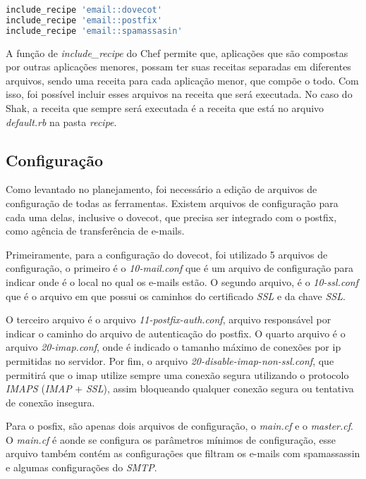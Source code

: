 \begin{lstlisting}[language=Ruby,label=dice_index,caption={Exemplo da receita de email
composta pelas receitas das outras aplicações}, label=codigo999]
include_recipe 'email::dovecot'
include_recipe 'email::postfix'
include_recipe 'email::spamassasin'
\end{lstlisting}

A função de \textit{include\_recipe} do Chef permite que, aplicações que são compostas
por outras aplicações menores, possam ter suas receitas separadas em diferentes arquivos,
sendo uma receita para cada aplicação menor, que compõe o todo. Com isso, foi possível 
incluir esses arquivos na receita que será executada. No caso do Shak, a receita
que sempre será executada é a receita que está no arquivo \textit{default.rb} na
pasta \textit{recipe}.

\subsection{Configuração}

Como levantado no planejamento, foi necessário a edição de arquivos de configuração
de todas as ferramentas. Existem arquivos de configuração para cada uma delas, inclusive
o dovecot, que precisa ser integrado com o postfix, como agência de transferência
de e-mails.

Primeiramente, para a configuração do dovecot, foi utilizado 5 arquivos
de configuração, o primeiro é o \textit{10-mail.conf} que é um arquivo de configuração para
indicar onde é o local no qual os e-mails estão. O segundo arquivo, é o \textit{10-ssl.conf}
que é o arquivo em que possui os caminhos do certificado \textit{SSL} e da chave \textit{SSL}.

O terceiro arquivo é o arquivo \textit{11-postfix-auth.conf}, arquivo responsável por 
indicar o caminho do arquivo de autenticação
do postfix. O quarto arquivo é o arquivo \textit{20-imap.conf}, onde é indicado o tamanho
máximo de conexões por ip permitidas no servidor. Por fim, o arquivo
\textit{20-disable-imap-non-ssl.conf}, que permitirá que o imap utilize sempre uma conexão
segura utilizando o protocolo \textit{IMAPS} (\textit{IMAP} + \textit{SSL}), assim bloqueando 
qualquer conexão segura ou tentativa de conexão insegura.

Para o posfix, são apenas dois arquivos de configuração, o \textit{main.cf} e o 
\textit{master.cf}.
O \textit{main.cf} é aonde se configura os parâmetros mínimos de configuração, esse arquivo
também contém as configurações que filtram os e-mails com spamassassin e 
algumas configurações do \textit{SMTP}. 

